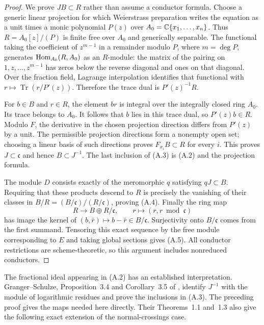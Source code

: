 \begin{proof}
We prove $JB\subset R$ rather than assume a conductor formula. Choose a generic linear projection for which Weierstrass preparation writes the equation as a unit times a monic polynomial $P(z)$ over $A_0=\mathbb C\{x_1,\ldots,x_n\}$. Thus $R=A_0[z]/(P)$ is finite free over $A_0$ and generically separable. The functional taking the coefficient of $z^{m-1}$ in a remainder modulo $P$, where $m=\deg P$, generates $\operatorname{Hom}_{A_0}(R,A_0)$ as an $R$-module: the matrix of the pairing on $1,z,\ldots,z^{m-1}$ has zeros below the reverse diagonal and ones on that diagonal. Over the fraction field, Lagrange interpolation identifies that functional with $r\mapsto\operatorname{Tr}(r/P'(z))$. Therefore the trace dual is $P'(z)^{-1}R$.

For $b\in B$ and $r\in R$, the element $br$ is integral over the integrally closed ring $A_0$. Its trace belongs to $A_0$. It follows that $b$ lies in this trace dual, so $P'(z)b\in R$. Modulo $F$, the derivative in the chosen projection direction differs from $P'(z)$ by a unit. The permissible projection directions form a nonempty open set; choosing a linear basis of such directions proves $F_{x_i}B\subset R$ for every $i$. This proves $J\subset\mathfrak c$ and hence $B\subset J^{-1}$. The last inclusion of (A.3) is (A.2) and the projection formula.

The module $D$ consists exactly of the meromorphic $q$ satisfying $qJ\subset B$. Requiring that these products descend to $R$ is precisely the vanishing of their classes in $B/R=(B/\mathfrak c)/(R/\mathfrak c)$, proving (A.4). Finally the ring map
\[
 R\longrightarrow B\oplus R/\mathfrak c,
 \qquad r\longmapsto(r,r\bmod\mathfrak c)
\]
has image the kernel of $(b,\bar r)\mapsto b-\bar r\in B/\mathfrak c$. Surjectivity onto $B/\mathfrak c$ comes from the first summand. Tensoring this exact sequence by the free module corresponding to $E$ and taking global sections gives (A.5). All conductor restrictions are scheme-theoretic, so this argument includes nonreduced conductors.
\end{proof}

The fractional ideal appearing in (A.2) has an established interpretation. Granger--Schulze, Proposition~3.4 and Corollary~3.5 of \cite{GS2014}, identify $J^{-1}$ with the module of logarithmic residues and prove the inclusions in (A.3). The preceding proof gives the maps needed here directly. Their Theorems~1.1 and~1.3 also give the following exact extension of the normal-crossings case.


